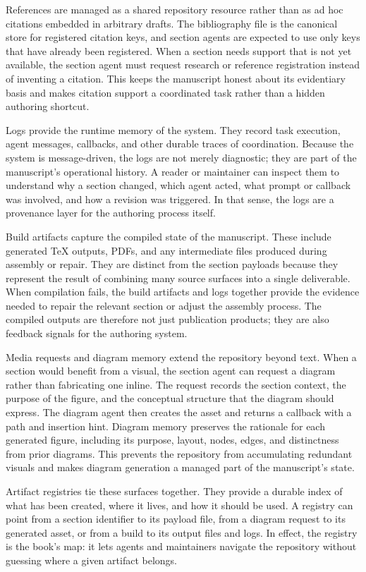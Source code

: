 \documentclass[11pt]{article}
\begin{document}
References are managed as a shared repository resource rather than as ad hoc citations embedded in arbitrary drafts. The bibliography file is the canonical store for registered citation keys, and section agents are expected to use only keys that have already been registered. When a section needs support that is not yet available, the section agent must request research or reference registration instead of inventing a citation. This keeps the manuscript honest about its evidentiary basis and makes citation support a coordinated task rather than a hidden authoring shortcut.

Logs provide the runtime memory of the system. They record task execution, agent messages, callbacks, and other durable traces of coordination. Because the system is message-driven, the logs are not merely diagnostic; they are part of the manuscript's operational history. A reader or maintainer can inspect them to understand why a section changed, which agent acted, what prompt or callback was involved, and how a revision was triggered. In that sense, the logs are a provenance layer for the authoring process itself.

Build artifacts capture the compiled state of the manuscript. These include generated \TeX{} outputs, PDFs, and any intermediate files produced during assembly or repair. They are distinct from the section payloads because they represent the result of combining many source surfaces into a single deliverable. When compilation fails, the build artifacts and logs together provide the evidence needed to repair the relevant section or adjust the assembly process. The compiled outputs are therefore not just publication products; they are also feedback signals for the authoring system.

Media requests and diagram memory extend the repository beyond text. When a section would benefit from a visual, the section agent can request a diagram rather than fabricating one inline. The request records the section context, the purpose of the figure, and the conceptual structure that the diagram should express. The diagram agent then creates the asset and returns a callback with a path and insertion hint. Diagram memory preserves the rationale for each generated figure, including its purpose, layout, nodes, edges, and distinctness from prior diagrams. This prevents the repository from accumulating redundant visuals and makes diagram generation a managed part of the manuscript's state.

Artifact registries tie these surfaces together. They provide a durable index of what has been created, where it lives, and how it should be used. A registry can point from a section identifier to its payload file, from a diagram request to its generated asset, or from a build to its output files and logs. In effect, the registry is the book's map: it lets agents and maintainers navigate the repository without guessing where a given artifact belongs.
\end{document}
